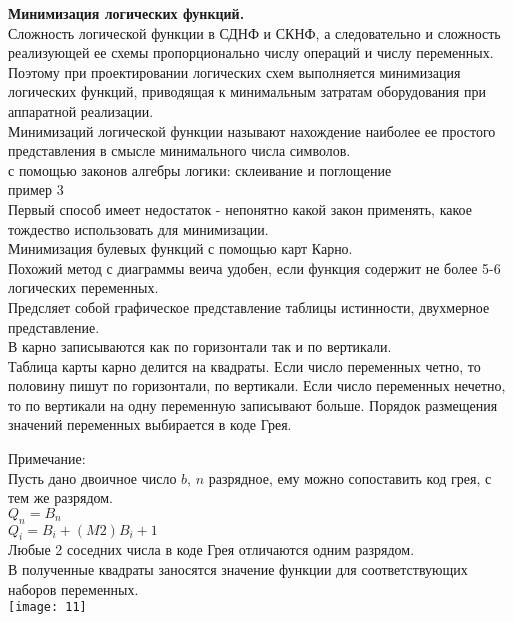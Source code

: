 \Large{ \textbf {Минимизация логических функций.}}\\
Сложность логической функции в СДНФ и СКНФ, а следовательно и сложность реализующей ее схемы пропорционально числу операций и числу переменных.
Поэтому при проектировании логических схем выполняется минимизация логических функций,
приводящая к минимальным затратам оборудования при аппаратной реализации.\\
Минимизаций логической функции называют нахождение наиболее ее простого представления в смысле минимального числа символов.\\
с помощью законов алгебры логики: склеивание и поглощение\\
пример 3\\
Первый способ имеет недостаток - непонятно какой закон применять, какое тождество использовать для минимизации.\\
Минимизация булевых функций с помощью карт Карно.\\
Похожий метод с диаграммы веича удобен, если функция содержит не более 5-6 логических переменных.\\
Предсляет собой графическое представление таблицы истинности, двухмерное представление.\\
В карно записываются как по горизонтали так и по вертикали.\\

Таблица карты карно делится на квадраты. Если число переменных четно,
то половину пишут по горизонтали, по вертикали. Если число переменных нечетно,
то по вертикали на одну переменную записывают больше.
Порядок размещения значений переменных выбирается в коде Грея.

Примечание:\\
Пусть дано двоичное число $b$, $n$ разрядное, ему можно сопоставить код грея, с тем же разрядом.\\
$Q_n = B_n$\\
$Q_i = B_i +(M2) B_i + 1$\\
Любые 2 соседних числа в коде Грея отличаются одним разрядом.\\
В полученные квадраты заносятся значение функции для соответствующих наборов переменных.\\
\texttt{[image: 11]}

